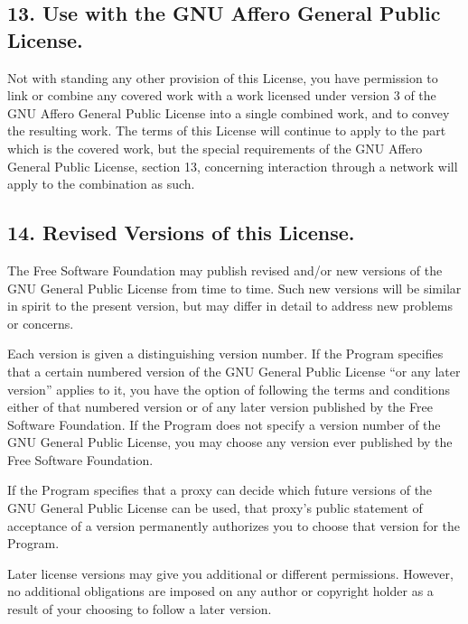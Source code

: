 \documentclass[letterpaper,10pt,english]{sphinxmanual}
\begin{document}
\subsection{13. Use with the GNU Affero General Public License.}
\label{\detokenize{license:use-with-the-gnu-affero-general-public-license}}
\sphinxAtStartPar
Not with standing any other provision of this License, you have
permission to link or combine any covered work with a work licensed
under version 3 of the GNU Affero General Public License into a single
combined work, and to convey the resulting work.  The terms of this
License will continue to apply to the part which is the covered work,
but the special requirements of the GNU Affero General Public License,
section 13, concerning interaction through a network will apply to the
combination as such.


\subsection{14. Revised Versions of this License.}
\label{\detokenize{license:revised-versions-of-this-license}}
\sphinxAtStartPar
The Free Software Foundation may publish revised and/or new versions of
the GNU General Public License from time to time.  Such new versions will
be similar in spirit to the present version, but may differ in detail to
address new problems or concerns.

\sphinxAtStartPar
Each version is given a distinguishing version number.  If the
Program specifies that a certain numbered version of the GNU General
Public License “or any later version” applies to it, you have the
option of following the terms and conditions either of that numbered
version or of any later version published by the Free Software
Foundation.  If the Program does not specify a version number of the
GNU General Public License, you may choose any version ever published
by the Free Software Foundation.

\sphinxAtStartPar
If the Program specifies that a proxy can decide which future
versions of the GNU General Public License can be used, that proxy’s
public statement of acceptance of a version permanently authorizes you
to choose that version for the Program.

\sphinxAtStartPar
Later license versions may give you additional or different
permissions.  However, no additional obligations are imposed on any
author or copyright holder as a result of your choosing to follow a
later version.
\end{document}
